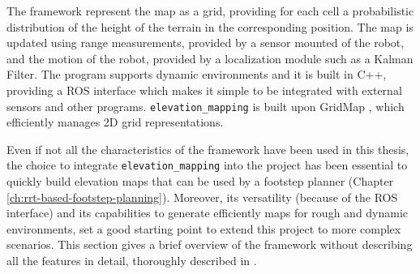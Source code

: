 The framework represent the map as a grid, providing for each cell a 
probabilistic distribution of the height of the terrain in the 
corresponding position. The map is updated using range measurements, provided 
by a sensor mounted of the robot, and the motion of the robot,
provided by a localization module such as a Kalman Filter.
The program supports dynamic environments and it is built in C++, providing 
a ROS \cite{ros-melodic} interface which makes it simple to be integrated with
external sensors and other programs. \texttt{elevation\_mapping} is built 
upon GridMap \cite{Fankhauser2016GridMapLibrary}, which efficiently manages 
2D grid representations.

Even if not all the characteristics of the framework have been used in this 
thesis, the choice to integrate \texttt{elevation\_mapping} into the project 
has been essential to quickly build elevation maps that can be used by a
footstep planner (Chapter \ref{ch:rrt-based-footstep-planning}). Moreover, its 
versatility (because of the ROS interface) and its capabilities to generate 
efficiently maps for rough and dynamic environments, set a good starting point 
to extend this project to more complex scenarios. This section gives a brief 
overview of the framework without describing all the features in detail,
thoroughly described in \cite{Fankhauser2018ProbabilisticTerrainMapping}.

